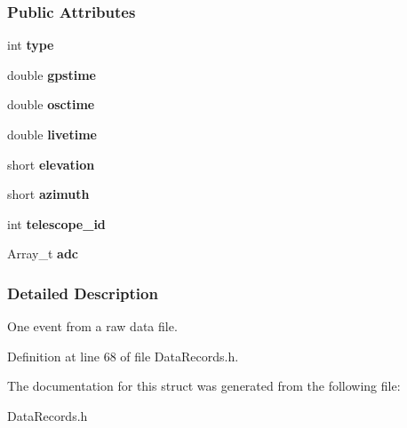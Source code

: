 \subsubsection*{Public Attributes}
\begin{DoxyCompactItemize}
\item 
\hypertarget{structRawEventRecord_acc7886a2fb11a6bfb9132879afb079c8}{
int {\bfseries type}}
\label{structRawEventRecord_acc7886a2fb11a6bfb9132879afb079c8}

\item 
\hypertarget{structRawEventRecord_aeed99c02bce8a12e4fac3956ca0b503d}{
double {\bfseries gpstime}}
\label{structRawEventRecord_aeed99c02bce8a12e4fac3956ca0b503d}

\item 
\hypertarget{structRawEventRecord_a7a3855135e75162d6cc56cc660c9a310}{
double {\bfseries osctime}}
\label{structRawEventRecord_a7a3855135e75162d6cc56cc660c9a310}

\item 
\hypertarget{structRawEventRecord_ae9dca8bc5831835b45564247f8d710fb}{
double {\bfseries livetime}}
\label{structRawEventRecord_ae9dca8bc5831835b45564247f8d710fb}

\item 
\hypertarget{structRawEventRecord_afa1d6ff6df7b0edfd9d1585eaa6f5eee}{
short {\bfseries elevation}}
\label{structRawEventRecord_afa1d6ff6df7b0edfd9d1585eaa6f5eee}

\item 
\hypertarget{structRawEventRecord_a827becd5b6d801ff65bd867c7654a268}{
short {\bfseries azimuth}}
\label{structRawEventRecord_a827becd5b6d801ff65bd867c7654a268}

\item 
\hypertarget{structRawEventRecord_ae6253089b2c41e82020c6c4df0e903be}{
int {\bfseries telescope\_\-id}}
\label{structRawEventRecord_ae6253089b2c41e82020c6c4df0e903be}

\item 
\hypertarget{structRawEventRecord_abd20470e19dc3881c103a5875fe81c52}{
Array\_\-t {\bfseries adc}}
\label{structRawEventRecord_abd20470e19dc3881c103a5875fe81c52}

\end{DoxyCompactItemize}


\subsubsection{Detailed Description}
One event from a raw data file. 

Definition at line 68 of file DataRecords.h.



The documentation for this struct was generated from the following file:\begin{DoxyCompactItemize}
\item 
DataRecords.h\end{DoxyCompactItemize}
